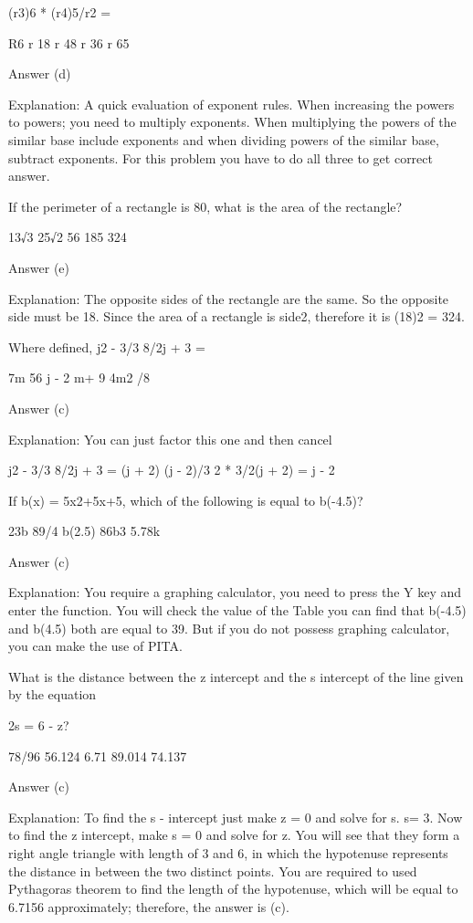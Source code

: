     (r3)6 * (r4)5/r2 =

        R6
        r 18
        r 48
        r 36
        r 65 

    Answer (d)

    Explanation: A quick evaluation of exponent rules. When increasing the powers to powers; you need to multiply exponents. When multiplying the powers of the similar base include exponents and when dividing powers of the similar base, subtract exponents. For this problem you have to do all three to get correct answer.

    If the perimeter of a rectangle is 80, what is the area of the rectangle?

        13√3
        25√2
        56
        185
        324 

    Answer (e)

    Explanation: The opposite sides of the rectangle are the same. So the opposite side must be 18. Since the area of a rectangle is side2, therefore it is (18)2 = 324.

    Where defined, {j2 - 3/3} {8/2j + 3} =

        7m
        56
        j - 2
        m+ 9
        4m2 /8 

    Answer (c)

    Explanation: You can just factor this one and then cancel

    {j2 - 3/3} {8/2j + 3} = {(j + 2) (j - 2)/3} {2 * 3/2(j + 2)} = j - 2 



    If b(x) = 5x2+5x+5, which of the following is equal to b(-4.5)?

        23b
        89/4
        b(2.5)
        86b3
        5.78k 

    Answer (c)

    Explanation: You require a graphing calculator, you need to press the Y key and enter the function. You will check the value of the Table you can find that b(-4.5) and b(4.5) both are equal to 39. But if you do not possess graphing calculator, you can make the use of PITA.

    What is the distance between the z intercept and the s intercept of the line given by the equation

    2s = 6 - z?

        78/96
        56.124
        6.71
        89.014
        74.137 

    Answer (c)

    Explanation: To find the s - intercept just make z = 0 and solve for s. s= 3. Now to find the z intercept, make s = 0 and solve for z. You will see that they form a right angle triangle with length of 3 and 6, in which the hypotenuse represents the distance in between the two distinct points. You are required to used Pythagoras theorem to find the length of the hypotenuse, which will be equal to 6.7156 approximately; therefore, the answer is (c).

